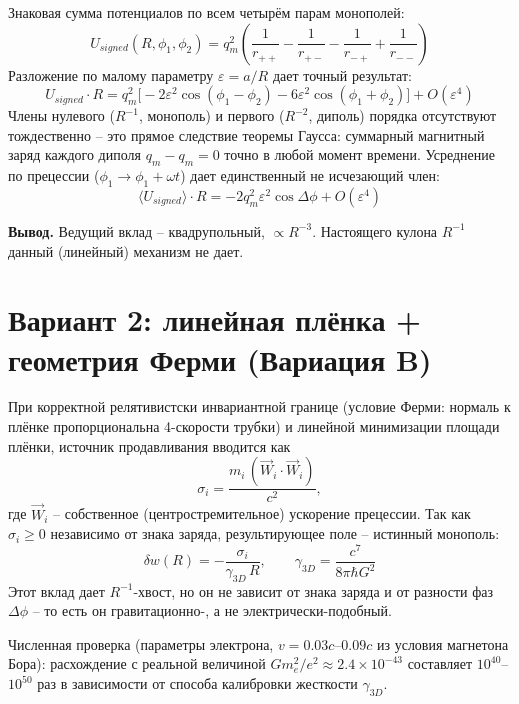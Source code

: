 \documentclass[12pt,a4paper]{article}
\begin{document}
Знаковая сумма потенциалов по всем четырём парам монополей:
\begin{equation}
U_{signed}(R,\phi_1,\phi_2) = q_m^2\left(
\frac{1}{r_{++}} - \frac{1}{r_{+-}} - \frac{1}{r_{-+}} + \frac{1}{r_{--}}
\right)
\end{equation}
Разложение по малому параметру $\varepsilon=a/R$ дает точный результат:
\begin{equation}
U_{signed}\cdot R = q_m^2\Big[-2\varepsilon^2\cos(\phi_1-\phi_2)
-6\varepsilon^2\cos(\phi_1+\phi_2)\Big] + O(\varepsilon^4)
\end{equation}
Члены нулевого ($R^{-1}$, монополь) и первого ($R^{-2}$, диполь) порядка
отсутствуют тождественно -- это прямое следствие теоремы Гаусса:
суммарный магнитный заряд каждого диполя $q_m-q_m=0$ точно в любой момент
времени. Усреднение по прецессии ($\phi_1\to\phi_1+\omega t$) дает
единственный не исчезающий член:
\begin{equation}
\langle U_{signed}\rangle \cdot R = -2q_m^2\varepsilon^2\cos\Delta\phi
+ O(\varepsilon^4)
\end{equation}

\textbf{Вывод.} Ведущий вклад -- квадрупольный, $\propto R^{-3}$.
Настоящего кулона $R^{-1}$ данный (линейный) механизм не дает.

\section{Вариант 2: линейная плёнка + геометрия Ферми (Вариация B)}

При корректной релятивистски инвариантной границе (условие Ферми:
нормаль к плёнке пропорциональна 4-скорости трубки) и линейной
минимизации площади плёнки, источник продавливания вводится как
\begin{equation}
\sigma_i = \frac{m_i\,(\vec W_i\cdot\vec W_i)}{c^2},
\end{equation}
где $\vec W_i$ -- собственное (центростремительное) ускорение
прецессии. Так как $\sigma_i\ge 0$ независимо от знака заряда,
результирующее поле -- истинный монополь:
\begin{equation}
\delta w(R) = -\frac{\sigma_i}{\gamma_{3D}\,R},\qquad
\gamma_{3D}=\frac{c^7}{8\pi\hbar G^2}
\end{equation}
Этот вклад дает $R^{-1}$-хвост, но он не зависит от знака
заряда и от разности фаз $\Delta\phi$ -- то есть он гравитационно-,
а не электрически-подобный.

Численная проверка (параметры электрона, $v=0.03c$--$0.09c$
из условия магнетона Бора): расхождение с реальной величиной
$Gm_e^2/e^2\approx 2.4\times10^{-43}$ составляет $10^{40}$--$10^{50}$
раз в зависимости от способа калибровки жесткости $\gamma_{3D}$.
\end{document}
